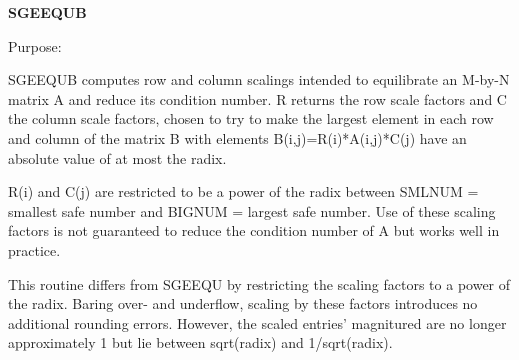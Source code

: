 {\bfseries S\+G\+E\+E\+Q\+U\+B} 

 \begin{DoxyParagraph}{Purpose\+: }
\begin{DoxyVerb} SGEEQUB computes row and column scalings intended to equilibrate an
 M-by-N matrix A and reduce its condition number.  R returns the row
 scale factors and C the column scale factors, chosen to try to make
 the largest element in each row and column of the matrix B with
 elements B(i,j)=R(i)*A(i,j)*C(j) have an absolute value of at most
 the radix.

 R(i) and C(j) are restricted to be a power of the radix between
 SMLNUM = smallest safe number and BIGNUM = largest safe number.  Use
 of these scaling factors is not guaranteed to reduce the condition
 number of A but works well in practice.

 This routine differs from SGEEQU by restricting the scaling factors
 to a power of the radix.  Baring over- and underflow, scaling by
 these factors introduces no additional rounding errors.  However, the
 scaled entries' magnitured are no longer approximately 1 but lie
 between sqrt(radix) and 1/sqrt(radix).\end{DoxyVerb}
 
\end{DoxyParagraph}

